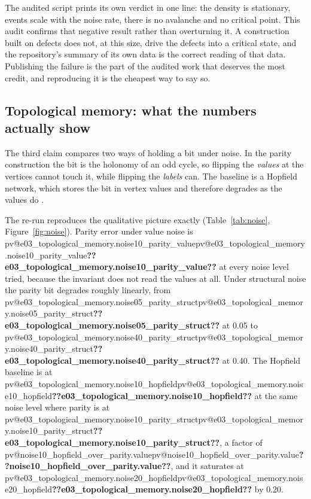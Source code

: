 \documentclass[11pt,a4paper]{article}
\makeatletter
\newcommand{\val}[1]{\ifcsname pv@#1\endcsname\csname pv@#1\endcsname\else\textbf{??#1??}\fi}
\makeatother
\begin{document}
The audited script prints its own verdict in one line: the density is stationary, events scale with
the noise rate, there is no avalanche and no critical point. This audit confirms that negative
result rather than overturning it. A construction built on defects does not, at this size, drive
the defects into a critical state, and the repository's summary of its own data is the correct
reading of that data. Publishing the failure is the part of the audited work that deserves the
most credit, and reproducing it is the cheapest way to say so.

\subsection{Topological memory: what the numbers actually show}
\label{sec:memory}

The third claim compares two ways of holding a bit under noise. In the parity construction the bit
is the holonomy of an odd cycle, so flipping the \emph{values} at the vertices cannot touch it,
while flipping the \emph{labels} can. The baseline is a Hopfield network, which stores the bit in
vertex values and therefore degrades as the values do \citep{hopfield1982}.

The re-run reproduces the qualitative picture exactly (Table~\ref{tab:noise},
Figure~\ref{fig:noise}). Parity error under value noise is \val{e03_topological_memory.noise10_parity_value}
at every noise level tried, because the invariant does not read the values at all. Under
structural noise the parity bit degrades roughly linearly, from
\val{e03_topological_memory.noise05_parity_struct} at
0.05 to \val{e03_topological_memory.noise40_parity_struct} at
0.40. The Hopfield baseline is at
\val{e03_topological_memory.noise10_hopfield} at the same noise level where parity is at
\val{e03_topological_memory.noise10_parity_struct}, a factor of
\val{noise10_hopfield_over_parity.value}, and it saturates at
\val{e03_topological_memory.noise20_hopfield} by 0.20.
\end{document}
